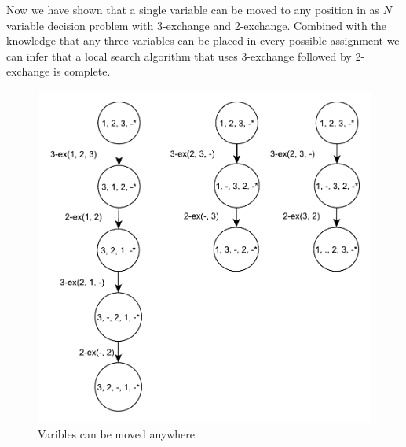 Now we have shown that a single variable can be moved to any position in as $N$ variable decision problem with 3-exchange and 2-exchange. Combined with the knowledge that any three variables can be placed in every possible assignment we can infer that a local search algorithm that uses 3-exchange followed by 2-exchange is complete.
\begin{figure}[h]
 \centering
 \includegraphics[width=12cm]{fig2.pdf}
 \caption{Varibles can be moved anywhere}
 \label{figure:fig2}
\end{figure}